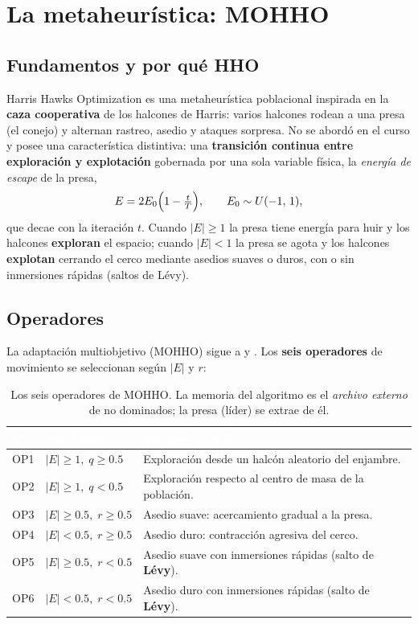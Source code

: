 \documentclass[11pt,letterpaper]{article}
\begin{document}
\section{La metaheurística: MOHHO}
\label{sec:mohho}

\subsection{Fundamentos y por qué HHO}
Harris Hawks Optimization \parencite{heidari2019} es una metaheurística poblacional inspirada en la \textbf{caza cooperativa} de los halcones de Harris: varios halcones rodean a una presa (el conejo) y alternan rastreo, asedio y ataques sorpresa. No se abordó en el curso y posee una característica distintiva: una \textbf{transición continua entre exploración y explotación} gobernada por una sola variable física, la \emph{energía de escape} de la presa,
\[
E = 2E_0\Bigl(1 - \tfrac{t}{T}\Bigr), \qquad E_0 \sim U(-1,\,1),
\]
que decae con la iteración $t$. Cuando $|E|\geq 1$ la presa tiene energía para huir y los halcones \textbf{exploran} el espacio; cuando $|E|<1$ la presa se agota y los halcones \textbf{explotan} cerrando el cerco mediante asedios suaves o duros, con o sin inmersiones rápidas (saltos de Lévy).

\subsection{Operadores}
La adaptación multiobjetivo (MOHHO) sigue a \textcite{kusoglu2020} y \textcite{cerci2022}. Los \textbf{seis operadores} de movimiento se seleccionan según $|E|$ y $r$:

\begin{table}[H]
\centering
\renewcommand{\arraystretch}{1.25}
\small
\begin{tabular}{clp{8.6cm}}
\toprule
\rowcolor{tablehead}
\textcolor{white}{\textbf{Op.}} & \textcolor{white}{\textbf{Condición}} & \textcolor{white}{\textbf{Comportamiento}}\\
\midrule
OP1 & $|E|\geq1,\; q\geq0.5$ & Exploración desde un halcón aleatorio del enjambre.\\
\rowcolor{gray!8}
OP2 & $|E|\geq1,\; q<0.5$ & Exploración respecto al centro de masa de la población.\\
OP3 & $|E|\geq0.5,\; r\geq0.5$ & Asedio suave: acercamiento gradual a la presa.\\
\rowcolor{gray!8}
OP4 & $|E|<0.5,\; r\geq0.5$ & Asedio duro: contracción agresiva del cerco.\\
OP5 & $|E|\geq0.5,\; r<0.5$ & Asedio suave con inmersiones rápidas (salto de \textbf{Lévy}).\\
\rowcolor{gray!8}
OP6 & $|E|<0.5,\; r<0.5$ & Asedio duro con inmersiones rápidas (salto de \textbf{Lévy}).\\
\bottomrule
\end{tabular}
\caption{Los seis operadores de MOHHO. La memoria del algoritmo es el \emph{archivo externo} de no dominados; la presa (líder) se extrae de él.}
\end{table}
\end{document}
